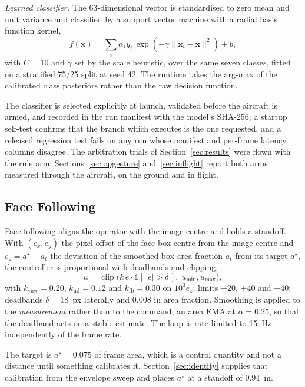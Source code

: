 \documentclass[conference]{IEEEtran}
\begin{document}
\textit{Learned classifier.} The 63-dimensional vector is standardised to zero
mean and unit variance and classified by a support vector machine with a radial
basis function kernel,
\begin{equation}
f(\mathbf{x})=\sum_{i}\alpha_i y_i\,
\exp\!\left(-\gamma\lVert\mathbf{x}_i-\mathbf{x}\rVert^2\right)+b ,
\label{eq:svm}
\end{equation}
with $C=10$ and $\gamma$ set by the scale heuristic, over the same seven classes,
fitted on a stratified 75/25 split at seed 42. The runtime takes the arg-max of
the calibrated class posteriors rather than the raw decision function.

The classifier is selected explicitly at launch, validated before the aircraft is
armed, and recorded in the run manifest with the model's SHA-256; a startup
self-test confirms that the branch which executes is the one requested, and a
released regression test fails on any run whose manifest and per-frame latency
columns disagree. The arbitration trials of Section~\ref{sec:results} were flown
with the rule arm. Sections~\ref{sec:opgesture} and~\ref{sec:inflight} report
both arms measured through the aircraft, on the ground and in flight.

\subsection{Face Following}
\label{sec:facefollow}

Face following aligns the operator with the image centre and holds a standoff.
With $(e_x,e_y)$ the pixel offset of the face box centre from the image centre
and $e_z=a^{\star}-\bar{a}_t$ the deviation of the smoothed box area fraction
$\bar{a}_t$ from its target $a^{\star}$, the controller is proportional with
deadbands and clipping,
\begin{equation}
u=\operatorname{clip}\!\big(k\,e\cdot\mathbb{1}[\,|e|>\delta\,],\;
u_{\min},u_{\max}\big),
\label{eq:follow}
\end{equation}
with $k_{\mathrm{yaw}}=0.20$, $k_{\mathrm{ud}}=0.12$ and
$k_{\mathrm{fb}}=0.30$ on $10^{3}e_z$; limits $\pm20$, $\pm40$ and $\pm40$;
deadbands $\delta=18$~px laterally and $0.008$ in area fraction. Smoothing is
applied to the \emph{measurement} rather than to the command, an area EMA at
$\alpha=0.25$, so that the deadband acts on a stable estimate. The loop is rate
limited to 15~Hz independently of the frame rate.

The target is $a^{\star}=0.075$ of frame area, which is a control quantity and
not a distance until something calibrates it. Section~\ref{sec:identity}
supplies that calibration from the envelope sweep and places $a^{\star}$ at a
standoff of 0.94~m.
\end{document}
